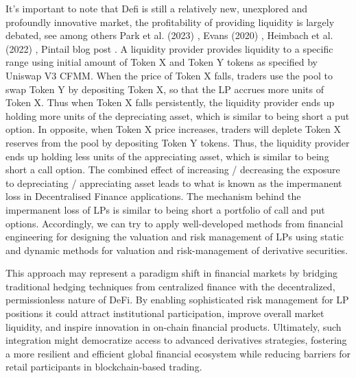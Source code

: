 \documentclass{article}
\begin{document}
It's important to note that Defi is still a relatively new, unexplored and profoundly innovative market, the profitability of providing liquidity is largely debated, see among others Park et al. (2023) \cite{park2023}, Evans (2020) \cite{evans2020}, Heimbach et al. (2022) \cite{heimbach2022}, Pintail blog post \cite{pintail2021}. \newline  
A liquidity provider provides liquidity to a specific range using initial amount of Token X and Token Y tokens as specified by Uniswap V3 CFMM. When the price of Token X falls, traders use the pool to swap Token Y by depositing
Token X, so that the LP accrues more units of Token X. Thus when Token X falls persistently, the liquidity
provider ends up holding more units of the depreciating asset, which is similar to being short a put
option. In opposite, when Token X price increases, traders will deplete Token X reserves from the pool by
depositing Token Y tokens. Thus, the liquidity provider ends up holding less units of the appreciating
asset, which is similar to being short a call option. The combined effect of increasing / decreasing
the exposure to depreciating / appreciating asset leads to what is known as the impermanent loss in Decentralised Finance applications.
The mechanism behind the impermanent loss of LPs is similar to being short a
portfolio of call and put options. Accordingly, we can try to apply well-developed methods from financial
engineering for designing the valuation and risk management of LPs using static and dynamic
methods for valuation and risk-management of derivative securities. 

This approach may represent a paradigm shift in financial markets by bridging traditional hedging techniques from centralized finance with the decentralized, permissionless nature of DeFi. By enabling sophisticated risk management for LP positions it could attract institutional participation, improve overall market liquidity, and inspire innovation in on-chain financial products. 
Ultimately, such integration might democratize access to advanced derivatives strategies, fostering a more resilient and efficient global financial ecosystem while reducing barriers for retail participants in blockchain-based trading.
\newpage
\end{document}
